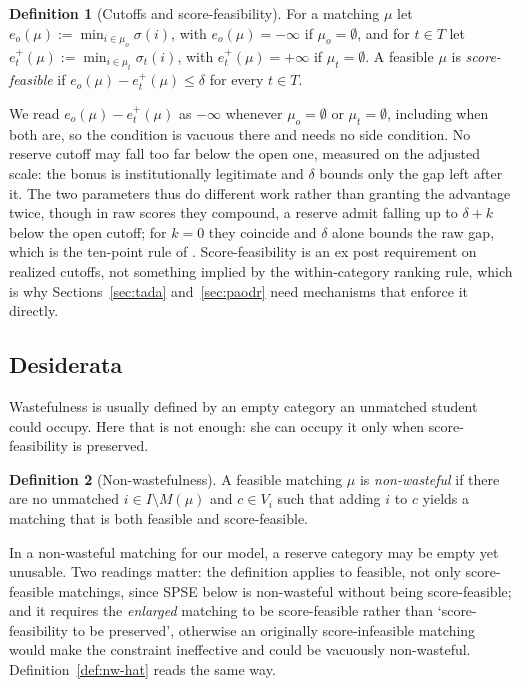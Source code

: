 \documentclass[a4paper,twoside]{article}
\theoremstyle{definition}
\newtheorem{definition}{Definition}
\begin{document}
\begin{definition}[Cutoffs and score-feasibility]
\label{def:scorefeas}
For a matching $\mu$ let $e_o(\mu):=\min_{i\in\mu_o}\sigma(i)$, with $e_o(\mu)=-\infty$ if $\mu_o=\emptyset$, and for $t\in T$ let $e_t^+(\mu):=\min_{i\in\mu_t}\sigma_t(i)$, with $e_t^+(\mu)=+\infty$ if $\mu_t=\emptyset$. A feasible $\mu$ is \emph{score-feasible} if $e_o(\mu)-e_t^+(\mu)\le\delta$ for every $t\in T$.
\end{definition}

We read $e_o(\mu)-e_t^+(\mu)$ as $-\infty$ whenever $\mu_o=\emptyset$ or $\mu_t=\emptyset$, including when both are, so the condition is vacuous there and needs no side condition. No reserve cutoff may fall too far below the open one, measured on the adjusted scale: the bonus is institutionally legitimate and $\delta$ bounds only the gap left after it. The two parameters thus do different work rather than granting the advantage twice, though in raw scores they compound, a reserve admit falling up to $\delta+k$ below the open cutoff; for $k=0$ they coincide and $\delta$ alone bounds the raw gap, which is the ten-point rule of \cite{AyTu23b}. Score-feasibility is an ex post requirement on realized cutoffs, not something implied by the within-category ranking rule, which is why Sections~\ref{sec:tada} and~\ref{sec:paodr} need mechanisms that enforce it directly.

\subsection{Desiderata}

Wastefulness is usually defined by an empty category an unmatched student could occupy. Here that is not enough: she can occupy it only when score-feasibility is preserved.

\begin{definition}[Non-wastefulness]
\label{def:nw}
A feasible matching $\mu$ is \emph{non-wasteful} if there are no unmatched $i\in I\setminus M(\mu)$ and $c\in V_i$ such that adding $i$ to $c$ yields a matching that is both feasible and score-feasible.
\end{definition}

In a non-wasteful matching for our model, a reserve category may be empty yet unusable. Two readings matter: the definition applies to feasible, not only score-feasible matchings, since SPSE below is non-wasteful without being score-feasible; and it requires the \emph{enlarged} matching to be score-feasible rather than `score-feasibility to be preserved', otherwise an originally score-infeasible matching would make the constraint ineffective and could be vacuously non-wasteful. Definition~\ref{def:nw-hat} reads the same way.
\end{document}
